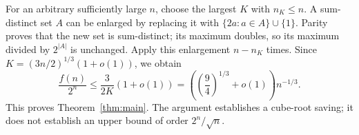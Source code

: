 \documentclass[reqno]{amsart}
\theoremstyle{remark}
\numberwithin{equation}{section}
\begin{document}
For an arbitrary sufficiently large $n$, choose the largest $K$ with
$n_K\leq n$. A sum-distinct set $A$ can be enlarged by replacing it with
$\{2a:a\in A\}\cup\{1\}$. Parity proves that the new set is sum-distinct;
its maximum doubles, so its maximum divided by $2^{|A|}$ is unchanged.
Apply this enlargement $n-n_K$ times. Since
$K=(3n/2)^{1/3}(1+o(1))$, we obtain
\[
 \frac{f(n)}{2^n}
 \leq\frac{3}{2K}(1+o(1))
 =\left(\left(\frac94\right)^{1/3}+o(1)\right)n^{-1/3}.
\]
This proves Theorem~\ref{thm:main}. The argument establishes a cube-root
saving; it does not establish an upper bound of order $2^n/\sqrt n$.
\end{document}
